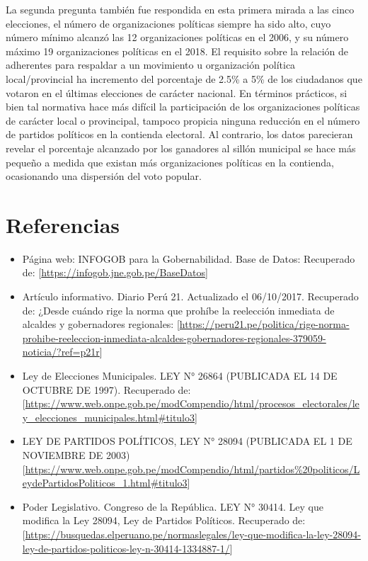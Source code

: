 \documentclass[
]{book}
\providecommand{\tightlist}{%
  \setlength{\itemsep}{0pt}\setlength{\parskip}{0pt}}
\begin{document}
La segunda pregunta también fue respondida en esta primera mirada a las cinco elecciones, el número de organizaciones políticas siempre ha sido alto, cuyo número mínimo alcanzó las 12 organizaciones políticas en el 2006, y su número máximo 19 organizaciones políticas en el 2018. El requisito sobre la relación de adherentes para respaldar a un movimiento u organización política local/provincial ha incremento del porcentaje de 2.5\% a 5\% de los ciudadanos que votaron en el últimas elecciones de carácter nacional. En términos prácticos, si bien tal normativa hace más difícil la participación de los organizaciones políticas de carácter local o provincipal, tampoco propicia ninguna reducción en el número de partidos políticos en la contienda electoral. Al contrario, los datos parecieran revelar el porcentaje alcanzado por los ganadores al sillón municipal se hace más pequeño a medida que existan más organizaciones políticas en la contienda, ocasionando una dispersión del voto popular.

\hypertarget{referencias}{%
\section{Referencias}\label{referencias}}

\begin{itemize}
\tightlist
\item
  Página web: INFOGOB para la Gobernabilidad. Base de Datos: Recuperado de: {[}\url{https://infogob.jne.gob.pe/BaseDatos}{]}
\item
  Artículo informativo. Diario Perú 21. Actualizado el 06/10/2017. Recuperado de: ¿Desde cuándo rige la norma que prohíbe la reelección inmediata de alcaldes y gobernadores regionales: {[}\url{https://peru21.pe/politica/rige-norma-prohibe-reeleccion-inmediata-alcaldes-gobernadores-regionales-379059-noticia/?ref=p21r}{]}
\item
  Ley de Elecciones Municipales. LEY N° 26864 (PUBLICADA EL 14 DE OCTUBRE DE 1997). Recuperado de: {[}\url{https://www.web.onpe.gob.pe/modCompendio/html/procesos_electorales/ley_elecciones_municipales.html\#titulo3}{]}
\item
  LEY DE PARTIDOS POLÍTICOS, LEY N° 28094 (PUBLICADA EL 1 DE NOVIEMBRE DE 2003){[}\url{https://www.web.onpe.gob.pe/modCompendio/html/partidos\%20politicos/LeydePartidosPoliticos_1.html\#titulo3}{]}
\item
  Poder Legislativo. Congreso de la República. LEY N° 30414. Ley que modifica la Ley 28094, Ley de Partidos Políticos. Recuperado de: {[}\url{https://busquedas.elperuano.pe/normaslegales/ley-que-modifica-la-ley-28094-ley-de-partidos-politicos-ley-n-30414-1334887-1/}{]}
\end{itemize}
\end{document}
